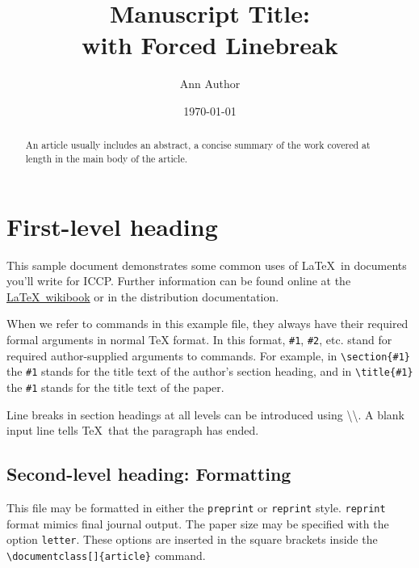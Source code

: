 \documentclass[]{article}
\begin{document}
\title{Manuscript Title:\\with Forced Linebreak}%
\author{Ann Author}
\date{\today}%
\maketitle

\begin{abstract}
An article usually includes an abstract, a concise summary of the work
covered at length in the main body of the article. 
\end{abstract}


\section{First-level heading} %
\label{sec:level1} %

This sample document demonstrates some common uses of \LaTeX\ in documents you'll write for ICCP. Further information can be found online at the \href{http://en.wikibooks.org/wiki/LaTeX}{\LaTeX\ wikibook} or in the distribution documentation. 

When we refer to commands in this example file, they always have their required formal arguments in normal \TeX{} format. In this format, \verb+#1+, \verb+#2+, etc. stand for required author-supplied arguments to commands. For example, in \verb+\section{#1}+ the \verb+#1+ stands for the title text of the author's section heading, and in \verb+\title{#1}+ the \verb+#1+ stands for the title text of the paper.

Line breaks in section headings at all levels can be introduced using \textbackslash\textbackslash. A blank input line tells \TeX\ that the paragraph has ended. 

\subsection{\label{sec:level2} Second-level heading: Formatting}

This file may be formatted in either the \texttt{preprint} or \texttt{reprint} style. \texttt{reprint} format mimics final journal output. The paper size may be specified with the option \texttt{letter}. These options are inserted in the square brackets inside the \texttt{\textbackslash documentclass[]\{article\}} command.
\end{document}
